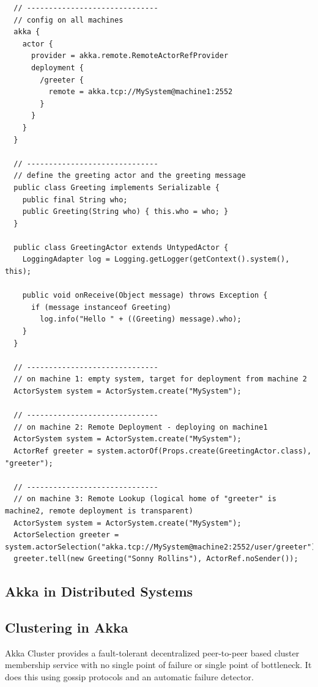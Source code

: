 \begin{lstlisting}
  // ------------------------------
  // config on all machines
  akka {
    actor {
      provider = akka.remote.RemoteActorRefProvider
      deployment {
        /greeter {
          remote = akka.tcp://MySystem@machine1:2552
        }
      }
    }
  }

  // ------------------------------
  // define the greeting actor and the greeting message
  public class Greeting implements Serializable {
    public final String who;
    public Greeting(String who) { this.who = who; }
  }

  public class GreetingActor extends UntypedActor {
    LoggingAdapter log = Logging.getLogger(getContext().system(), this);

    public void onReceive(Object message) throws Exception {
      if (message instanceof Greeting)
        log.info("Hello " + ((Greeting) message).who);
    }
  }

  // ------------------------------
  // on machine 1: empty system, target for deployment from machine 2
  ActorSystem system = ActorSystem.create("MySystem");

  // ------------------------------
  // on machine 2: Remote Deployment - deploying on machine1
  ActorSystem system = ActorSystem.create("MySystem");
  ActorRef greeter = system.actorOf(Props.create(GreetingActor.class), "greeter");

  // ------------------------------
  // on machine 3: Remote Lookup (logical home of "greeter" is machine2, remote deployment is transparent)
  ActorSystem system = ActorSystem.create("MySystem");
  ActorSelection greeter = system.actorSelection("akka.tcp://MySystem@machine2:2552/user/greeter");
  greeter.tell(new Greeting("Sonny Rollins"), ActorRef.noSender());
\end{lstlisting}

  \subsection{Akka in Distributed Systems}

  \subsection{Clustering in Akka}
  Akka Cluster provides a fault-tolerant decentralized peer-to-peer based cluster membership service with no single point of failure or single point of bottleneck. It does this using gossip protocols and an automatic failure detector.

